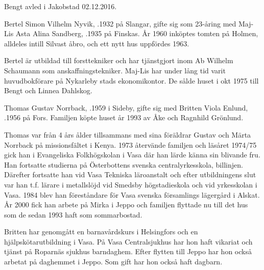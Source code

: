 Bengt avled i Jakobstad 02.12.2016.


Bertel Simon Vilhelm Nyvik, .1932 på Slangar, gifte sig som 23-åring med Maj-Lis Asta Alina Sandberg, .1935 på Finskas. År 1960 inköptes tomten på Holmen, alldeles intill Silvast åbro, och ett nytt hus uppfördes 1963.

Bertel är utbildad till forsttekniker och har tjänstgjort inom Ab Wilhelm Schaumann som anskaffningstekniker. Maj-Lis har under lång tid varit huvudbokförare på Nykarleby stads ekonomikontor. De sålde huset i okt 1975 till Bengt och Linnea Dahlskog.






Thomas Gustav Norrback, .1959 i Sideby, gifte sig med Britten Viola Enlund, .1956 på Fors. Familjen köpte huset år 1993  av Åke och Ragnhild Grönlund.

Thomas var från 4 års ålder tillsammans med sina föräldrar Gustav och Märta Norrback på missionsfältet i Kenya. 1973 återvände familjen och läsåret 1974/75 gick han i Evangeliska Folkhögskolan i Vasa där han lärde känna sin blivande fru. Han fortsatte studierna på Österbottens svenska centralyrkesskola, billinjen. Därefter fortsatte han vid Vasa Tekniska läroanstalt och efter utbildningens slut var han t.f. lärare i metallslöjd vid Smedsby högstadieskola och vid yrkesskolan i Vasa. 1984 blev han föreståndare för Vasa svenska församlings lägergård i Alskat. År 2000 fick han arbete på Mirka i Jeppo och familjen flyttade nu till det hus som de sedan 1993 haft som sommarbostad.

Britten har genomgått en barnavårdskurs i Helsingfors och en hjälpskötarutbildning i Vasa. På Vasa Centralsjukhus har hon haft vikariat och tjänst på Roparnäs sjukhus barndaghem. Efter flytten till Jeppo har hon också  arbetat på daghemmet i Jeppo. Som gift har hon också haft dagbarn.
\begin{jhchildren}
  \item {}
  \item {}
  \item {}
\end{jhchildren}


